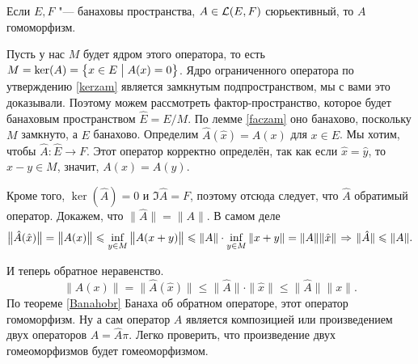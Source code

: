 \begin{The}[о гомоморфизме]\label{ogom}
  Если $E,F$ "--- банаховы пространства, $A\in\mathcal L(E,F)$ сюрьективный, то $A$ гомоморфизм.
\end{The}
\begin{Proof}
  Пусть у нас $M$ будет ядром этого оператора, то есть $M = \ker(A) = \big\{x\in E\bigm| A(x)=0\big\}$. Ядро ограниченного оператора по утверждению \ref{kerzam} является замкнутым подпространством, мы с вами это доказывали. Поэтому можем рассмотреть фактор-пространство, которое будет банаховым пространством $\hat E = E/M$. По лемме \ref{faczam} оно банахово, поскольку $M$ замкнуто, а $E$ банахово. Определим $\hat A(\hat x) = A(x)$ для $x\in E$. Мы хотим, чтобы $\hat A\colon\hat E\to F$. Этот оператор корректно определён, так как если $\hat x = \hat y$, то $x-y\in M$, значит, $A(x) = A(y)$.
 
Кроме того, $\ker(\hat A) = 0$ и $\Im\hat A=F$, поэтому отсюда следует, что $\hat A$ обратимый оператор. Докажем, что $\|\hat A\| = \|A\|$. В самом деле 
\[
  \big\|\hat A(\hat x)\big\| = \big\|A(x)\big\| \leqslant \inf\limits_{y\in M}\big\|A(x+y)\big\|\leqslant \|A\|\cdot \inf\limits_{y\in M}\|x+y\| = \| A\|\|\hat x\|\hspace{1pt plus1pt}\Rightarrow\hspace{1pt plus1pt} \|\hat A\|\leqslant \|A\|.
\]

И теперь обратное неравенство.
\[
  \big\|A(x)\big\| = \big\|\hat A(\hat x)\big\|\le \|\hat A\|\cdot\|\hat x\|\le \|\hat A\|\|x\|.
\]
По теореме \ref{Banahobr} Банаха об обратном операторе, этот оператор гомоморфизм. Ну а сам оператор $A$ является композицией или произведением двух операторов $A = \hat A\pi$. Легко проверить, что произведение двух гомеоморфизмов будет гомеоморфизмом.
\end{Proof}

